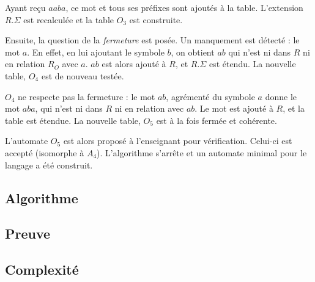 Ayant reçu $aaba$, ce mot et tous ses préfixes sont ajoutés à la table. L'extension $R.\Sigma$ est recalculée et la table $O_3$ est construite.

Ensuite, la question de la \emph{fermeture} est posée. Un manquement est détecté : le mot $a$. En effet, en lui ajoutant le symbole $b$, on obtient $ab$ qui n'est ni dans $R$ ni en relation $R_O$ avec $a$. $ab$ est alors ajouté à $R$, et $R.\Sigma$ est étendu. La nouvelle table, $O_4$ est de nouveau testée.

$O_4$ ne respecte pas la fermeture : le mot $ab$, agrémenté du symbole $a$ donne le mot $aba$, qui n'est ni dans $R$ ni en relation avec $ab$. Le mot est ajouté à $R$, et la table est étendue. La nouvelle table, $O_5$ est à la fois fermée et cohérente.

L'automate $O_5$ est alors proposé à l'enseignant pour vérification. Celui-ci est accepté (isomorphe à $A_4$). L'algorithme s'arrête et un automate minimal pour le langage a été construit. 

\subsection{Algorithme}\label{ss:a_algo}

\subsection{Preuve}\label{ss:a_proof}

\subsection{Complexité}\label{ss:a_comp}
